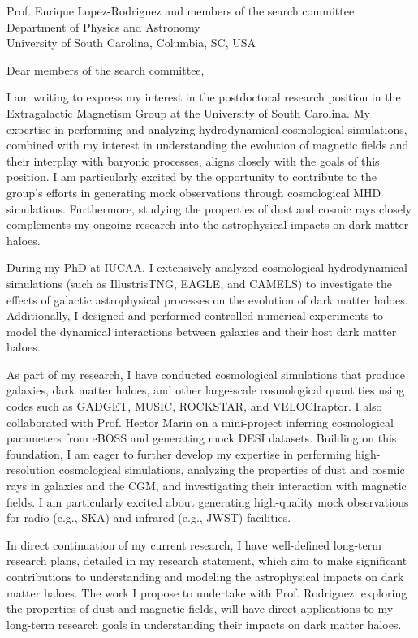 \documentclass[11pt]{letter}
\begin{document}
\begin{letter}{Prof. Enrique Lopez-Rodriguez and members of the search committee \\ Department of Physics and Astronomy \\ University of South Carolina, Columbia, SC, USA}

\opening{Dear members of the search committee,}

I am writing to express my interest in the postdoctoral research position in the Extragalactic Magnetism Group at the University of South Carolina. My expertise in performing and analyzing hydrodynamical cosmological simulations, combined with my interest in understanding the evolution of magnetic fields and their interplay with baryonic processes, aligns closely with the goals of this position. I am particularly excited by the opportunity to contribute to the group's efforts in generating mock observations through cosmological MHD simulations. Furthermore, studying the properties of dust and cosmic rays closely complements my ongoing research into the astrophysical impacts on dark matter haloes.

During my PhD at IUCAA, I extensively analyzed cosmological hydrodynamical simulations (such as IllustrisTNG, EAGLE, and CAMELS) to investigate the effects of galactic astrophysical processes on the evolution of dark matter haloes. Additionally, I designed and performed controlled numerical experiments to model the dynamical interactions between galaxies and their host dark matter haloes.




As part of my research, I have conducted cosmological simulations that produce galaxies, dark matter haloes, and other large-scale cosmological quantities using codes such as GADGET, MUSIC, ROCKSTAR, and VELOCIraptor. I also collaborated with Prof. Hector Marin on a mini-project inferring cosmological parameters from eBOSS and generating mock DESI datasets. Building on this foundation, I am eager to further develop my expertise in performing high-resolution cosmological simulations, analyzing the properties of dust and cosmic rays in galaxies and the CGM, and investigating their interaction with magnetic fields. I am particularly excited about generating high-quality mock observations for radio (e.g., SKA) and infrared (e.g., JWST) facilities.

In direct continuation of my current research, I have well-defined long-term research plans, detailed in my research statement, which aim to make significant contributions to understanding and modeling the astrophysical impacts on dark matter haloes. The work I propose to undertake with Prof. Rodriguez, exploring the properties of dust and magnetic fields, will have direct applications to my long-term research goals in understanding their impacts on dark matter haloes.


\end{letter}
\end{document}

